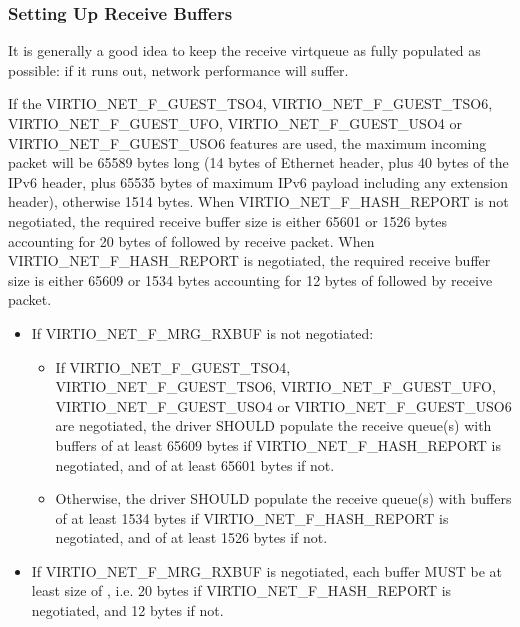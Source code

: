 \subsubsection{Setting Up Receive Buffers}\label{sec:Device Types / Network Device / Device Operation / Setting Up Receive Buffers}

It is generally a good idea to keep the receive virtqueue as
fully populated as possible: if it runs out, network performance
will suffer.

If the VIRTIO_NET_F_GUEST_TSO4, VIRTIO_NET_F_GUEST_TSO6,
VIRTIO_NET_F_GUEST_UFO, VIRTIO_NET_F_GUEST_USO4 or VIRTIO_NET_F_GUEST_USO6
features are used, the maximum incoming packet
will be 65589 bytes long (14 bytes of Ethernet header, plus 40 bytes of
the IPv6 header, plus 65535 bytes of maximum IPv6 payload including any
extension header), otherwise 1514 bytes.
When VIRTIO_NET_F_HASH_REPORT is not negotiated, the required receive buffer
size is either 65601 or 1526 bytes accounting for 20 bytes of
 followed by receive packet.
When VIRTIO_NET_F_HASH_REPORT is negotiated, the required receive buffer
size is either 65609 or 1534 bytes accounting for 12 bytes of
 followed by receive packet.


\begin{itemize}
\item If VIRTIO_NET_F_MRG_RXBUF is not negotiated:
  \begin{itemize}
    \item If VIRTIO_NET_F_GUEST_TSO4, VIRTIO_NET_F_GUEST_TSO6, VIRTIO_NET_F_GUEST_UFO,
	VIRTIO_NET_F_GUEST_USO4 or VIRTIO_NET_F_GUEST_USO6 are negotiated, the driver SHOULD populate
      the receive queue(s) with buffers of at least 65609 bytes if
      VIRTIO_NET_F_HASH_REPORT is negotiated, and of at least 65601 bytes if not.
    \item Otherwise, the driver SHOULD populate the receive queue(s)
      with buffers of at least 1534 bytes if VIRTIO_NET_F_HASH_REPORT
      is negotiated, and of at least 1526 bytes if not.
  \end{itemize}
\item If VIRTIO_NET_F_MRG_RXBUF is negotiated, each buffer MUST be at
least size of ,
i.e. 20 bytes if VIRTIO_NET_F_HASH_REPORT is negotiated, and 12 bytes if not.
\end{itemize}

